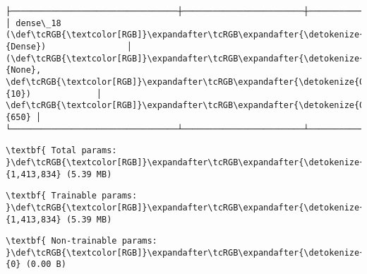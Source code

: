 \documentclass[12pt letter]{report}
\begin{document}
\begin{Verbatim}[commandchars=\\\{\}]
├─────────────────────────────────┼────────────────────────┼───────────────┤
│ dense\_18 (\def\tcRGB{\textcolor[RGB]}\expandafter\tcRGB\expandafter{\detokenize{0,135,255}}{Dense})                │ (\def\tcRGB{\textcolor[RGB]}\expandafter\tcRGB\expandafter{\detokenize{0,215,255}}{None}, \def\tcRGB{\textcolor[RGB]}\expandafter\tcRGB\expandafter{\detokenize{0,175,0}}{10})             │           \def\tcRGB{\textcolor[RGB]}\expandafter\tcRGB\expandafter{\detokenize{0,175,0}}{650} │
└─────────────────────────────────┴────────────────────────┴───────────────┘

    \end{Verbatim}

    
    
    \begin{Verbatim}[commandchars=\\\{\}]
\textbf{ Total params: }\def\tcRGB{\textcolor[RGB]}\expandafter\tcRGB\expandafter{\detokenize{0,175,0}}{1,413,834} (5.39 MB)

    \end{Verbatim}

    
    
    \begin{Verbatim}[commandchars=\\\{\}]
\textbf{ Trainable params: }\def\tcRGB{\textcolor[RGB]}\expandafter\tcRGB\expandafter{\detokenize{0,175,0}}{1,413,834} (5.39 MB)

    \end{Verbatim}

    
    
    \begin{Verbatim}[commandchars=\\\{\}]
\textbf{ Non-trainable params: }\def\tcRGB{\textcolor[RGB]}\expandafter\tcRGB\expandafter{\detokenize{0,175,0}}{0} (0.00 B)

    \end{Verbatim}
\end{document}
